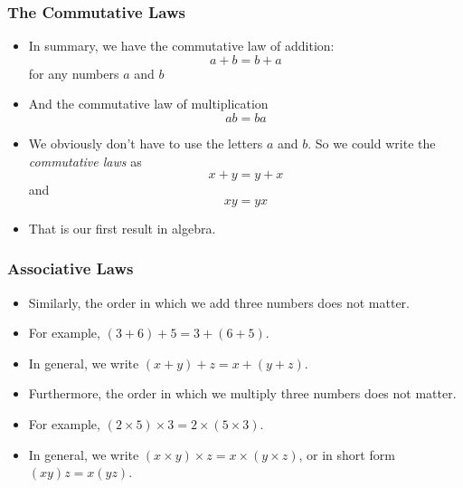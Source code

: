 \documentclass[serif,ignorenonframetext]{beamer}
\begin{document}
\begin{frame}
  \frametitle{The Commutative Laws}
  \begin{itemize}[<+->]
  \item In summary, we have the commutative law of addition:
    \begin{equation*}
      a+b=b+a
    \end{equation*}
    for any numbers $a$ and $b$
  \item And the commutative law of multiplication
    \begin{equation*}
      ab=ba
    \end{equation*}
  \item We obviously don't have to use the letters $a$ and $b$.  So we
    could write the \textit{commutative laws} as
    \begin{equation*}
      x+y=y+x
    \end{equation*}
    and
    \begin{equation*}
      xy=yx
    \end{equation*}
  \item That is our first result in algebra.
  \end{itemize}
\end{frame}

\begin{frame}
  \frametitle{Associative Laws}
  \begin{itemize}[<+->]
  \item Similarly, the order in which we add three numbers does not
    matter.
  \item For example, $(3+6)+5=3+(6+5)$.
  \item In general, we write $(x+y)+z=x+(y+z)$.
  \item Furthermore, the order in which we multiply three numbers does
    not matter.
  \item For example, $(2\times 5)\times 3 = 2\times (5\times 3)$.
  \item In general, we write $(x\times y)\times z= x\times(y\times
    z)$, or in short form $(xy)z = x(yz)$.
  \end{itemize}
\end{frame}
\end{document}
